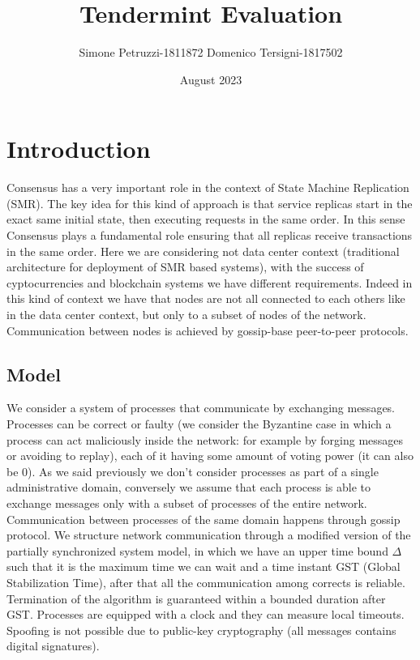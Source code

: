 \documentclass{article}
\title{Tendermint Evaluation}
\author{Simone Petruzzi-1811872 Domenico Tersigni-1817502}
\date{August 2023}
\begin{document}
   \maketitle
   \section{Introduction}
   Consensus has a very important role in the context of State Machine Replication (SMR). The key idea for this kind of approach is that service replicas start in the exact same initial state, then executing requests in the same order. In this sense Consensus plays a fundamental role ensuring that all replicas receive transactions in the same order.
   \newline
   \newline
   Here we are considering not data center context (traditional architecture for deployment of SMR based systems), with the success of cyptocurrencies and blockchain systems we have different requirements. Indeed in this kind of context we have that nodes are not all connected to each others like in the data center context, but only to a subset of nodes of the network. Communication between nodes is achieved by gossip-base peer-to-peer protocols.
   \subsection{Model}
   We consider a system of processes that communicate by exchanging messages. Processes can be correct or faulty (we consider the Byzantine case in which a process can act maliciously inside the network: for example by forging messages or avoiding to replay), each of it having some amount of voting power (it can also be 0). As we said previously we don't consider processes as part of a single administrative domain, conversely we assume that each process is able to exchange messages only with a subset of processes of the entire network. Communication between processes of the same domain happens through gossip protocol. We structure network communication through a modified version of the partially synchronized system model, in which we have an upper time bound $\Delta$ such that it is the maximum time we can wait and a time instant GST (Global Stabilization Time), after that all the communication among corrects is reliable. \\
   Termination of the algorithm is guaranteed within a bounded duration after GST. Processes are equipped with a clock and they can measure local timeouts. Spoofing is not possible due to public-key cryptography (all messages contains digital signatures).
\end{document}
